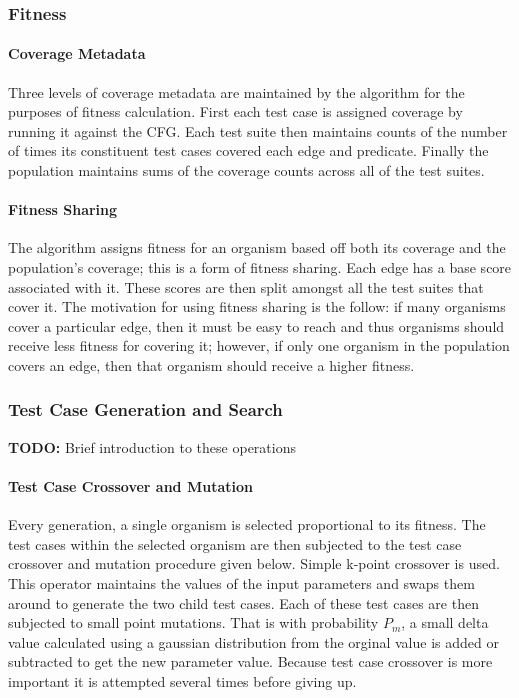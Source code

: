 \documentclass[runningheads]{llncs}
\begin{document}
\subsubsection{Fitness}

\paragraph{Coverage Metadata}
Three levels of coverage metadata are maintained by the algorithm for the purposes of fitness calculation. First each test case is assigned coverage by running it against the CFG. Each test suite then maintains counts of the number of times its constituent test cases covered each edge and predicate. Finally the population maintains sums of the coverage counts across all of the test suites.

\paragraph{Fitness Sharing}
The algorithm assigns fitness for an organism based off both its coverage and the population's coverage; this is a form of fitness sharing. Each edge has a base score associated with it. These scores are then split amongst all the test suites that cover it. The motivation for using fitness sharing is the follow: if many organisms cover a particular edge, then it must be easy to reach and thus organisms should receive less fitness for covering it; however, if only one organism in the population covers an edge, then that organism should receive a higher fitness.

\subsubsection{Test Case Generation and Search} 
\textbf{TODO:} Brief introduction to these operations

\FloatBarrier
\paragraph{Test Case Crossover and Mutation}
Every generation, a single organism is selected proportional to its fitness. The test cases within the selected organism are then subjected to the test case crossover and mutation procedure given below. Simple k-point crossover is used. This operator maintains the values of the input parameters and swaps them around to generate the two child test cases. Each of these test cases are then subjected to small point mutations. That is with probability $P_m$, a small delta value calculated using a gaussian distribution from the orginal value is added or subtracted to get the new parameter value. Because test case crossover is more important it is attempted several times before giving up.
 
\end{document}
